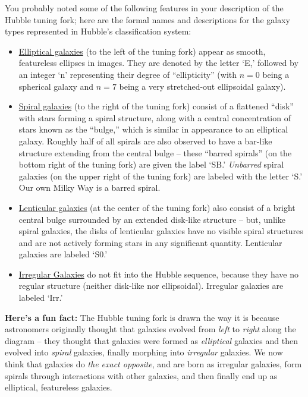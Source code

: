 \documentclass[11pt]{article}
\begin{document}
\noindent
You probably noted some of the following features in your description of the Hubble tuning fork; here are the formal names and descriptions for the galaxy types represented in Hubble's classification system:

\begin{itemize}
    \item \underline{Elliptical galaxies} (to the left of the tuning fork) appear as smooth, featureless ellipses in images. They are denoted by the letter `E,' followed by an integer `n' representing their degree of ``ellipticity'' (with $n=0$ being a spherical galaxy and $n=7$ being a very stretched-out ellipsoidal galaxy).
    
    \item \underline{Spiral galaxies} (to the right of the tuning fork) consist of a flattened ``disk'' with stars forming a spiral structure, along with a central concentration of stars known as the ``bulge,'' which is similar in appearance to an elliptical galaxy. Roughly half of all spirals are also observed to have a bar-like structure extending from the central bulge -- these ``barred spirals'' (on the bottom right of the tuning fork) are given the label `SB.' \emph{Unbarred} spiral galaxies (on the upper right of the tuning fork) are labeled with the letter `S.' Our own Milky Way is a barred spiral.
    
    \item \underline{Lenticular galaxies} (at the center of the tuning fork) also consist of a bright central bulge surrounded by an extended disk-like structure -- but, unlike spiral galaxies, the disks of lenticular galaxies have no visible spiral structures and are not actively forming stars in any significant quantity. Lenticular galaxies are labeled `S0.'
    
    \item \underline{Irregular Galaxies} do not fit into the Hubble sequence, because they have no regular structure (neither disk-like nor ellipsoidal). Irregular galaxies are labeled `Irr.'
\end{itemize}


\noindent
\textbf{Here's a fun fact:} The Hubble tuning fork is drawn the way it is because astronomers originally thought that galaxies evolved from \emph{left} to \emph{right} along the diagram -- they thought that galaxies were formed as \textit{elliptical} galaxies and then evolved into \textit{spiral} galaxies, finally morphing into \textit{irregular} galaxies. We now think that galaxies do \emph{the exact opposite}, and are born as irregular galaxies, form spirals through interactions with other galaxies, and then finally end up as elliptical, featureless galaxies.
\medskip
\end{document}
